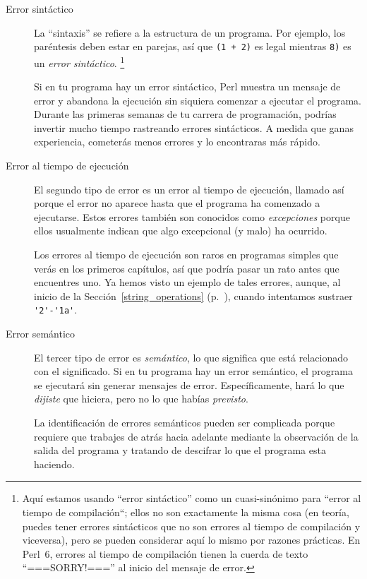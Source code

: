 \begin{description}

\item[Error sintáctico] La ``sintaxis'' se refiere a la estructura de un 
programa. Por ejemplo, los paréntesis deben estar en parejas, así que 
{\tt (1 + 2)} es legal mientras {\tt 8)} es un \emph{error sintáctico}.
\footnote{Aquí estamos usando ``error sintáctico'' como un cuasi-sinónimo
para ``error al tiempo de compilación``; ellos no son exactamente la misma cosa
(en teoría, puedes tener errores sintácticos que no son errores al tiempo
de compilación y viceversa), pero se pueden considerar aquí lo mismo por razones
prácticas. En Perl~6, errores al tiempo de compilación tienen la cuerda de texto
``===SORRY!==='' al inicio del mensaje de error.}


Si en tu programa hay un error sintáctico, Perl muestra 
un mensaje de error y abandona la ejecución sin siquiera 
comenzar a ejecutar el programa. Durante las primeras semanas de 
tu carrera de programación, podrías invertir mucho tiempo rastreando
errores sintácticos. A medida que ganas experiencia, cometerás menos errores
y lo encontraras más rápido.


\item[Error al tiempo de ejecución] El segundo tipo de error es un 
error al tiempo de ejecución, llamado así porque el error no aparece hasta que 
el programa ha comenzado a ejecutarse. Estos errores también son conocidos
como \emph{excepciones} porque ellos usualmente indican que algo excepcional (y malo)
ha ocurrido. 

Los errores al tiempo de ejecución son raros en programas simples 
que verás en los primeros capítulos, así que podría pasar un rato antes
que encuentres uno. Ya hemos visto un ejemplo de tales errores, aunque, 
al inicio de la Sección~\ref{string_operations} (p.~\pageref{string_operations}), 
cuando intentamos sustraer \verb"'2'-'1a'".


\item[Error semántico] El tercer tipo de error es \emph{semántico}, lo que
significa que está relacionado con el significado. Si en tu programa hay un error
semántico, el programa se ejecutará sin generar mensajes de error. Específicamente,
hará lo que \emph{dijiste} que hiciera, pero no lo que habías \emph{previsto}.

La identificación de errores semánticos pueden ser complicada porque requiere
que trabajes de atrás hacia adelante mediante la observación de la salida
del programa y tratando de descifrar lo que el programa esta haciendo.

\end{description}


